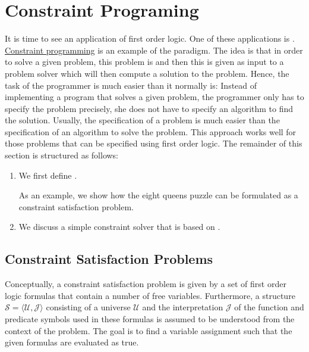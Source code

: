 \section{Constraint Programing}
It is time to see an application of first order logic. One of these applications is .  
\href{https://en.wikipedia.org/wiki/Constraint_programming}{Constraint programming} is an example of the
 paradigm.  The idea is that 
in order to solve a given problem, this problem is  and then this  is
given as input to a problem solver which will then compute a solution to the problem.  Hence, the task of the
programmer is much easier than it normally is: Instead of implementing a program that solves a given problem,
the programmer only has to specify the problem precisely, she does not have to specify an algorithm to find the
solution.  Usually, the specification of a problem is much easier than the specification of an algorithm to solve the problem.  This approach works well for those problems
that can be specified using first order logic.  The remainder of this section is structured as follows:
\begin{enumerate}
\item We first define .

      As an example, we show how the eight queens puzzle can be formulated as a constraint satisfaction
      problem.  
\item We discuss a simple constraint solver that is based on .
\end{enumerate}

\subsection{Constraint Satisfaction Problems}
Conceptually, a constraint satisfaction problem is given by a set of first order logic formulas that contain a
number of free variables.  Furthermore, a structure $\mathcal{S} = \langle \mathcal{U}, \mathcal{J}\rangle $
consisting of a universe $\mathcal{U}$ and the interpretation $\mathcal{J}$ of the function and predicate 
symbols used in these formulas is assumed to be understood from the context of the problem.  The goal is 
to find a variable assignment such that the given formulas are evaluated as true.

